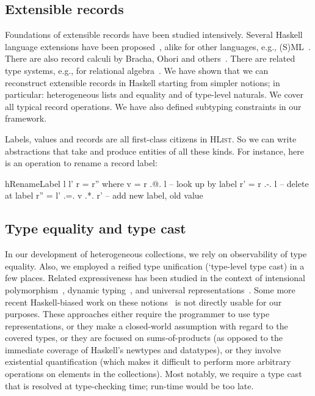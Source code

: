 \documentclass[nocopyrightspace,preprint]{sigplan-proc}
\newcommand{\HList}{\textsc{HList}}
\begin{document}



\medskip

\subsection*{Extensible records}

Foundations of extensible records have been studied intensively.
Several Haskell language extensions have been
proposed~\cite{GJ96,SM01,PJM03}, alike for other languages, e.g.,
(S)ML~\cite{Burton90,Remy94}. There are also record calculi by Bracha,
Ohori and others~\cite{BL92,Ohori95}. There are related type systems,
e.g., for relational algebra~\cite{BW02}. We have shown that we can
reconstruct extensible records in Haskell starting from simpler
notions; in particular: heterogeneous lists and equality and of
type-level naturals. We cover all typical record operations. We have
also defined subtyping constraints in our framework.

Labels, values and records are all first-class citizens in \HList. So
we can write abstractions that take and produce entities of all these
kinds. For instance, here is an operation to rename a record label:

\begin{code}
 hRenameLabel l l' r = r'' where
   v   = r  .@. l        -- look up by label
   r'  = r  .-. l        -- delete at label
   r'' = l' .=. v .*. r' -- add new label, old value
\end{code}






\medskip 

\subsection*{Type equality and type cast}

In our development of heterogeneous collections, we rely on
observability of type equality. Also, we employed a reified type
unification (`type-level type cast) in a few places. Related
expressiveness has been studied in the context of intensional
polymorphism~\cite{HM95}, dynamic typing~\cite{ACPP89,ACPR92}, and
universal representations~\cite{Yang98}. Some more recent
Haskell-biased work on these notions~\cite{Weirich00,CH02,BS02} is not
directly usable for our purposes. These approaches either require the
programmer to use type representations, or they make a closed-world
assumption with regard to the covered types, or they are focused on
sums-of-products (as opposed to the immediate coverage of Haskell's
newtypes and datatypes), or they involve existential quantification
(which makes it difficult to perform more arbitrary operations on
elements in the collections). Most notably, we require a type cast
that is resolved at type-checking time; run-time would be too late.
\end{document}
